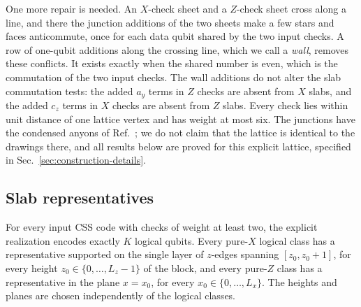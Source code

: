 One more repair is needed.  An $X$-check sheet and a $Z$-check sheet cross
along a line, and there the junction additions of the two sheets make a few
stars and faces anticommute, once for each data qubit shared by the two input
checks.  A row of one-qubit additions along the crossing line, which we call
a \emph{wall}, removes these conflicts.  It exists exactly when the shared
number is even, which is the commutation of the two input checks.  The wall additions do not alter the slab commutation tests: the added
$a_y$ terms in $Z$ checks are absent from $X$ slabs, and the added $c_z$
terms in $X$ checks are absent from $Z$ slabs.
Every check lies within unit distance of one lattice vertex and has weight at
most six.  The junctions have the condensed anyons of
Ref.~\cite{WilliamsonBaspinLayerCodes}; we do not claim that the lattice is
identical to the drawings there, and all results below are proved for this
explicit lattice, specified in Sec.~\ref{sec:construction-details}.

\subsection{Slab representatives}

\begin{theorem}
\label{thm:slabs}
For every input CSS code with checks of weight at least two, the explicit
realization encodes exactly $K$ logical qubits.  Every pure-$X$ logical class has a representative supported
on the single layer of $z$-edges spanning $[z_0,z_0+1]$, for every height
$z_0\in\{0,\ldots,L_z-1\}$ of the block, and every pure-$Z$ class has a
representative in the plane $x=x_0$, for every $x_0\in\{0,\ldots,L_x\}$.  The heights and planes are chosen independently of
the logical classes.
\end{theorem}

